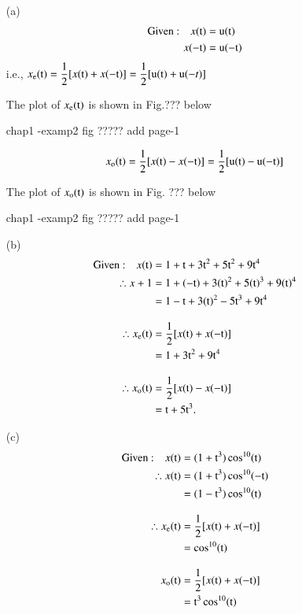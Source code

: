 \begin{solution}
\begin{itemize}
\item[{\rm(a)}]
\begin{align*}
\text{Given~:} \quad x(\textrm{t})&= \textrm{u}(\textrm{t})\\
                     x(-\textrm{t})&= \textrm{u}(-\textrm{t})
\end{align*}
i.e., $x_{\textrm{e}}(\textrm{t}) = \dfrac{1}{2}[x(\textrm{t}) + x(-\textrm{t})] = \dfrac{1}{2}[\textrm{u}(\textrm{t})+ \textrm{u}(-t)]$

The plot of $x_{\textrm{e}}(\textrm{t})$ is shown in Fig.??? below
\begin{center}
chap1 -examp2  fig ????? add page-1
\end{center}
$$
x_{\textrm{o}}(\textrm{t}) = \dfrac{1}{2}[x(\textrm{t})-x(-\textrm{t})] = \dfrac{1}{2}[\textrm{u}(\textrm{t})-\textrm{u}(-\textrm{t})]
$$


The plot of $x_{\textrm{o}}(\textrm{t})$ is shown in Fig. ??? below
\begin{center}
chap1 -examp2  fig ????? add page-1
\end{center}

\item[{\rm (b)}]
\begin{align*}
\text{Given~:} \quad x(\textrm{t}) &= 1+ \textrm{t} + 3 \textrm{t}^{2} + 5\textrm{t}^{2} +9\textrm{t}^{4}\\
               \therefore x+1 &= 1+(-\textrm{t})+ 3(\textrm{t})^{2} + 5(\textrm{t})^{3} + 9(\textrm{t})^{4}\\
                              &=1-\textrm{t} + 3(\textrm{t})^{2}-5\textrm{t}^{3} + 9\textrm{t}^{4}\\[0.3cm]
        \therefore x_{\textrm{e}}(\textrm{t}) &= \dfrac{1}{2}[x(\textrm{t}) + x(-\textrm{t})]\\
                           &=1 + 3\textrm{t}^{2} + 9\textrm{t}^{4}\\[0.3cm]
        \therefore x_{\textrm{o}}(\textrm{t}) &= \dfrac{1}{2} [x(\textrm{t})-x(-\textrm{t})]\\
                                  &= \textrm{t}+ 5\textrm{t}^{3}.                           
\end{align*}

\item[{\rm (c)}]
\begin{align*}
\text{Given~:} \quad x(\textrm{t})&= (1 + \textrm{t}^{3}) \cos^{10}(\textrm{t})\\
\therefore x(\textrm{t}) &= (1 + \textrm{t}^{3}) \cos^{10}(-\textrm{t})\\
&=(1-\textrm{t}^{3}) \cos^{10}(\textrm{t})\\[0.3cm]
\therefore x_{\textrm{e}}(\textrm{t}) &= \dfrac{1}{2}[x(\textrm{t})+ x(-\textrm{t})]\\
 &= \cos^{10}(\textrm{t})\\[0.3cm]
x_{\textrm{o}}(\textrm{t}) &= \dfrac{1}{2}[x(\textrm{t}) + x(-\textrm{t})]\\
 &= \textrm{t}^{3} \cos^{10}(\textrm{t}) 
\end{align*}


\end{itemize}
\end{solution}
